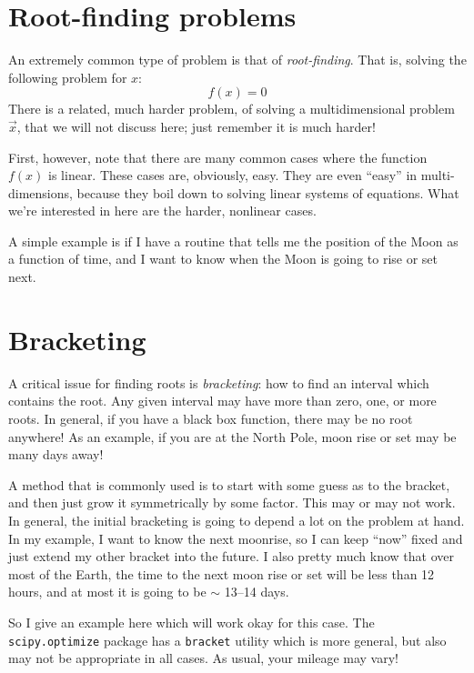 \section{Root-finding problems}

An extremely common type of problem is that of {\it
  root-finding}. That is, solving the following problem for $x$:
\begin{equation}
f(x) = 0
\end{equation}
There is a related, much harder problem, of solving a multidimensional
problem $\vec{x}$, that we will not discuss here; just remember it is
much harder!

First, however, note that there are many common cases where the
function $f(x)$ is linear. These cases are, obviously, easy. They are
even ``easy'' in multi-dimensions, because they boil down to solving
linear systems of equations. What we're interested in here are the
harder, nonlinear cases.

A simple example is if I have a routine that tells me the position of
the Moon as a function of time, and I want to know when the Moon is
going to rise or set next. 

\section{Bracketing}

A critical issue for finding roots is {\it bracketing}: how to find an
interval which contains the root. Any given interval may have more
than zero, one, or more roots. In general, if you have a black box
function, there may be no root anywhere! As an example, if you are at
the North Pole, moon rise or set may be many days away!

A method that is commonly used is to start with some guess as to the
bracket, and then just grow it symmetrically by some factor. This may
or may not work. In general, the initial bracketing is going to depend
a lot on the problem at hand. In my example, I want to know the next
moonrise, so I can keep ``now'' fixed and just extend my other bracket
into the future. I also pretty much know that over most of the Earth,
the time to the next moon rise or set will be less than 12 hours, and
at most it is going to be $\sim$ 13--14 days.

So I give an example here which will work okay for this case. The {\tt
  scipy.optimize} package has a {\tt bracket} utility which is more
general, but also may not be appropriate in all cases. As usual, your
mileage may vary!


